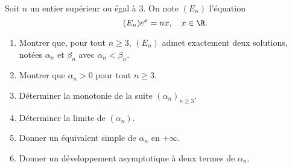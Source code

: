 \begin{enonce}
\begin{exercise}[ID={RMS135 E1445},subtitle={IMT MP 2024},tags={},difficulty={}]

Soit $n$ un entier supérieur ou égal à $3$. On note $(E_n)$ l’équation
\begin{equation}
\tag{$E_n$}
e^x = nx,\quad x \in \R.
\end{equation}

\begin{enumerate}
  \item Montrer que, pour tout $n \geq 3$, $(E_n)$ admet exactement deux solutions, notées $\alpha_n$ et $\beta_n$ avec $\alpha_n < \beta_n$.
  \item Montrer que $\alpha_n > 0$ pour tout $n \geq 3$.
  \item Déterminer la monotonie de la suite $(\alpha_n)_{n \geq 3}$.
  \item Déterminer la limite de $(\alpha_n)$.
  \item Donner un équivalent simple de $\alpha_n$ en $+\infty$.
  \item Donner un développement asymptotique à deux termes de $\alpha_n$.
\end{enumerate}

\end{exercise}
\begin{solution}
\end{solution}
\end{enonce}
